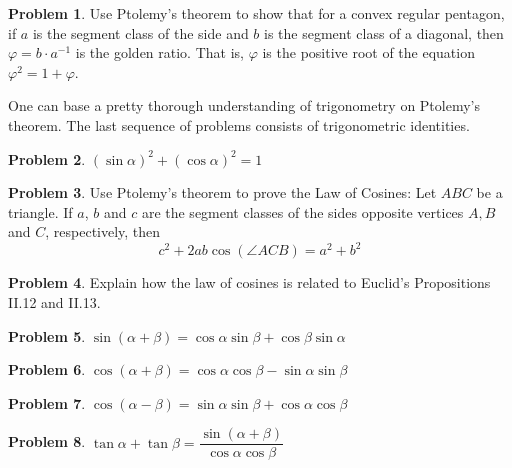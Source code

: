 \documentclass{amsart}
\theoremstyle{definition}
\newtheorem{problem}{Problem}[section]
\begin{document}
\begin{problem}
Use Ptolemy's theorem to show that for a convex regular pentagon, if $a$ is the segment class of the side and $b$ is the segment class of a diagonal, then $\varphi = b\cdot a^{-1}$ is the golden ratio. That is, $\varphi$ is the positive root of the equation $\varphi^2 = 1+ \varphi$.
\end{problem}


One can base a pretty thorough understanding of trigonometry on Ptolemy's theorem. The last sequence of problems consists of trigonometric identities.

\begin{problem} $(\sin\alpha)^2 + (\cos\alpha)^2 = 1$
\end{problem}

\begin{problem} Use Ptolemy's theorem to prove the Law of Cosines: Let $ABC$ be a triangle. If $a$, $b$ and $c$ are the segment classes of the sides opposite vertices $A, B$ and $C$, respectively, then
\[
c^2 + 2a b \cos(\angle ACB)= a^2 + b^2
\]
\end{problem}

\begin{problem} Explain how the law of cosines is related to Euclid's Propositions II.12 and II.13.
\end{problem}

\begin{problem}
$\sin(\alpha + \beta) = \cos\alpha \sin\beta + \cos\beta\sin\alpha$
\end{problem}


\begin{problem}
$\cos(\alpha + \beta) = \cos\alpha\cos\beta - \sin\alpha\sin\beta$
\end{problem}


\begin{problem}
$\cos(\alpha - \beta) = \sin\alpha\sin\beta + \cos\alpha\cos\beta$
\end{problem}


\begin{problem}
$\tan \alpha + \tan\beta = \dfrac{\sin(\alpha + \beta)}{\cos\alpha\cos\beta}$
\end{problem}


\vfill
\pagebreak


%
\end{document}
